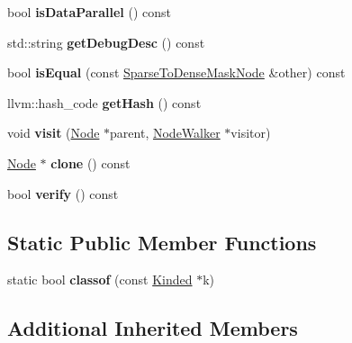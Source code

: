 \begin{DoxyCompactItemize}
bool {\bfseries is\+Data\+Parallel} () const
\item 
\mbox{\label{classglow_1_1_sparse_to_dense_mask_node_a2061bb9b6c9401d10390d3d1d1351c33}} 
std\+::string {\bfseries get\+Debug\+Desc} () const
\item 
\mbox{\label{classglow_1_1_sparse_to_dense_mask_node_a1fd6bd5b9a77e46fcaf26907cdcead34}} 
bool {\bfseries is\+Equal} (const \hyperlink{classglow_1_1_sparse_to_dense_mask_node}{Sparse\+To\+Dense\+Mask\+Node} \&other) const
\item 
\mbox{\label{classglow_1_1_sparse_to_dense_mask_node_ad53ec93ad65ef758b46c062ac1e02517}} 
llvm\+::hash\+\_\+code {\bfseries get\+Hash} () const
\item 
\mbox{\label{classglow_1_1_sparse_to_dense_mask_node_a2baf04caf40fe208e4aa26283577a91d}} 
void {\bfseries visit} (\hyperlink{classglow_1_1_node}{Node} $\ast$parent, \hyperlink{classglow_1_1_node_walker}{Node\+Walker} $\ast$visitor)
\item 
\mbox{\label{classglow_1_1_sparse_to_dense_mask_node_afa64fb94d9c771ce93ac7ba67e1cf26c}} 
\hyperlink{classglow_1_1_node}{Node} $\ast$ {\bfseries clone} () const
\item 
\mbox{\label{classglow_1_1_sparse_to_dense_mask_node_acb589493cc58cf988708abc8df7ee1aa}} 
bool {\bfseries verify} () const
\end{DoxyCompactItemize}
\subsection*{Static Public Member Functions}
\begin{DoxyCompactItemize}
\item 
\mbox{\label{classglow_1_1_sparse_to_dense_mask_node_a9adf9d395dd12ff4de4bdee26c7868ad}} 
static bool {\bfseries classof} (const \hyperlink{classglow_1_1_kinded}{Kinded} $\ast$k)
\end{DoxyCompactItemize}
\subsection*{Additional Inherited Members}


